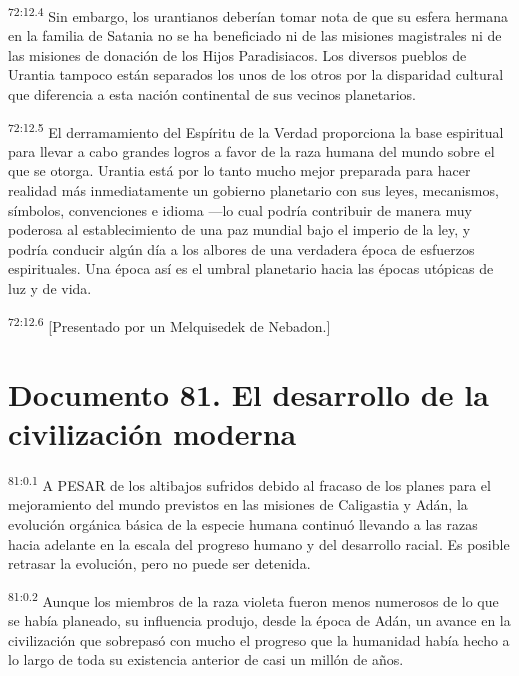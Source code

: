 \documentclass[twoside, 11pt]{book}
\begin{document}
\par
\textsuperscript{72:12.4} Sin embargo, los urantianos deberían tomar nota de que su esfera hermana en la familia de Satania no se ha beneficiado ni de las misiones magistrales ni de las misiones de donación de los Hijos Paradisiacos. Los diversos pueblos de Urantia tampoco están separados los unos de los otros por la disparidad cultural que diferencia a esta nación continental de sus vecinos planetarios.

\par
\textsuperscript{72:12.5} El derramamiento del Espíritu de la Verdad proporciona la base espiritual para llevar a cabo grandes logros a favor de la raza humana del mundo sobre el que se otorga. Urantia está por lo tanto mucho mejor preparada para hacer realidad más inmediatamente un gobierno planetario con sus leyes, mecanismos, símbolos, convenciones e idioma ---lo cual podría contribuir de manera muy poderosa al establecimiento de una paz mundial bajo el imperio de la ley, y podría conducir algún día a los albores de una verdadera época de esfuerzos espirituales. Una época así es el umbral planetario hacia las épocas utópicas de luz y de vida.

\par
\textsuperscript{72:12.6} [Presentado por un Melquisedek de Nebadon.]


\chapter{Documento 81. El desarrollo de la civilización moderna}
\par
\textsuperscript{81:0.1} A PESAR de los altibajos sufridos debido al fracaso de los planes para el mejoramiento del mundo previstos en las misiones de Caligastia y Adán, la evolución orgánica básica de la especie humana continuó llevando a las razas hacia adelante en la escala del progreso humano y del desarrollo racial. Es posible retrasar la evolución, pero no puede ser detenida.

\par
\textsuperscript{81:0.2} Aunque los miembros de la raza violeta fueron menos numerosos de lo que se había planeado, su influencia produjo, desde la época de Adán, un avance en la civilización que sobrepasó con mucho el progreso que la humanidad había hecho a lo largo de toda su existencia anterior de casi un millón de años.
\end{document}
